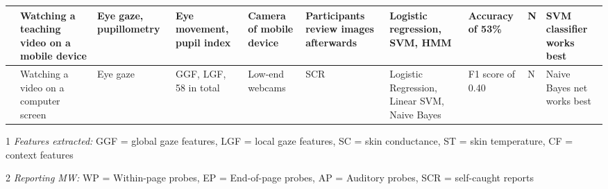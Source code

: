 \begin{xtabular}{p{25mm}p{30mm}p{30mm}p{22mm}p{38mm}p{22mm}p{33mm}p{22mm}p{35mm}}
\cite{ISI:000443429900018} & Watching a teaching video on a mobile device & Eye gaze, pupillometry & Eye movement, pupil index & Camera of mobile device & Participants review images afterwards & Logistic regression, SVM, HMM & Accuracy of 53\% & N & SVM classifier works best\\ \midrule 
\cite{Zhao2017ScalableApproach} & Watching a video on a computer screen & Eye gaze & GGF, LGF, 58 in total & Low-end webcams & SCR & Logistic Regression, Linear SVM, Naive Bayes & F1 score of 0.40 & N & Naive Bayes net works best\\ \midrule
\bottomrule
\end{xtabular}
\begin{ThreePartTable}
        \begin{tablenotes}
        \small
        \item[1] \emph{Features extracted:} GGF = global gaze features, LGF = local gaze features, SC = skin conductance, ST = skin temperature, CF = context features
        \item[2] \emph{Reporting MW:} WP = Within-page probes, EP = End-of-page probes, AP = Auditory probes, SCR = self-caught reports
        \end{tablenotes}
\end{ThreePartTable}
\restoregeometry %
\twocolumn       %